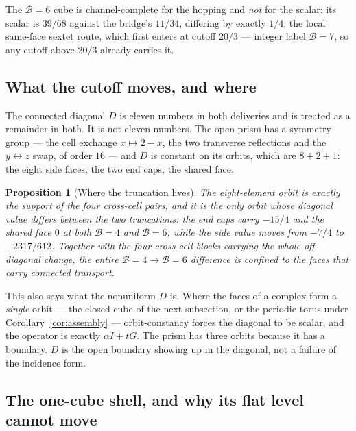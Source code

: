 \documentclass[11pt]{article}
\theoremstyle{plain}
\newtheorem{proposition}[theorem]{Proposition}
\theoremstyle{definition}
\theoremstyle{remark}
\newcommand{\chk}[1]{}
\begin{document}
The $\mathcal B=6$ cube is channel-complete for the hopping and \emph{not} for the
scalar: its scalar is $39/68$ against the bridge's $11/34$, differing by
exactly $1/4$, the local same-face sextet route, which first enters at cutoff
$20/3$ --- integer label $\mathcal B=7$, so any cutoff above $20/3$ already carries it.
\chk{the B = 6 scalar misses the bridge's by exactly the same-face sextet route}

\subsection{What the cutoff moves, and where}

The connected diagonal $D$ is eleven numbers in both deliveries and is treated
as a remainder in both. It is not eleven numbers. The open prism has a symmetry
group --- the cell exchange $x\mapsto2-x$, the two transverse reflections and
the $y\leftrightarrow z$ swap, of order $16$ --- and $D$ is constant on its
orbits, which are $8+2+1$: the eight side faces, the two end caps, the shared
face.

\begin{proposition}[Where the truncation lives]\label{prop:orbit}
The eight-element orbit is exactly the support of the four cross-cell pairs,
and it is the only orbit whose diagonal value differs between the two
truncations: the end caps carry $-15/4$ and the shared face $0$ at both
$\mathcal B=4$ and $\mathcal B=6$, while the side value moves from $-7/4$ to
$-2317/612$. Together with
the four cross-cell blocks carrying the whole off-diagonal change, the entire
$\mathcal B=4\to\mathcal B=6$ difference is confined to the faces that carry connected transport.
\end{proposition}
\chk{the connected diagonal is orbit-constant, and only the transporting orbit moves}

This also says what the nonuniform $D$ is. Where the faces of a complex form a
\emph{single} orbit --- the closed cube of the next subsection, or the periodic
torus under Corollary~\ref{cor:assembly} --- orbit-constancy forces the diagonal to
be scalar, and the operator is exactly $\alpha I+tG$. The prism has three
orbits because it has a boundary. $D$ is the open boundary showing up in the
diagonal, not a failure of the incidence form.

\subsection{The one-cube shell, and why its flat level cannot move}
\end{document}
